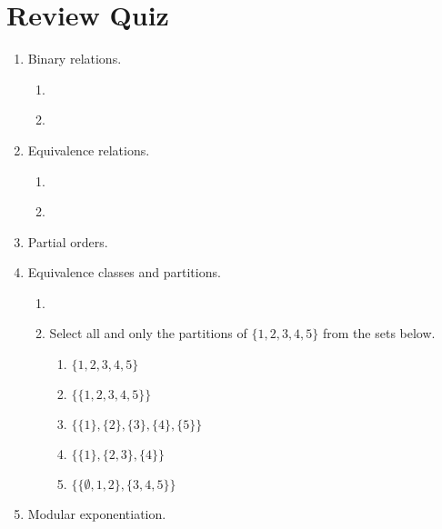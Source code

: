 \newpage
\section*{Review Quiz}
\begin{enumerate}
    \item Binary relations. 
        \begin{enumerate}
            \item \hspace{1in}\\ 
            \item \hspace{1in}\\ 
        \end{enumerate}
    \item Equivalence relations. 
        \begin{enumerate}
            \item \hspace{1in}\\  
            \item \hspace{1in}\\ 
        \end{enumerate}
    \item Partial orders. \hspace{1in}\\ 
    \item Equivalence classes and partitions. 
        \begin{enumerate}
            \item \hspace{1in}\\ 
            \item Select all and only the partitions of $\{1,2,3,4,5\}$ from the sets below.
            \begin{enumerate}
            \item $\{1,2,3,4,5\}$
            \item $\{\{1,2,3,4,5\}\}$
            \item $\{\{1\},\{2\},\{3\},\{4\},\{5\}\}$
            \item $\{ \{1\}, \{2,3\}, \{4\} \}$
            \item $\{ \{\emptyset, 1, 2\}, \{3,4,5\}\}$
            \end{enumerate}
        \end{enumerate}
    \item Modular exponentiation. \hspace{1in}\\ 
\end{enumerate}
